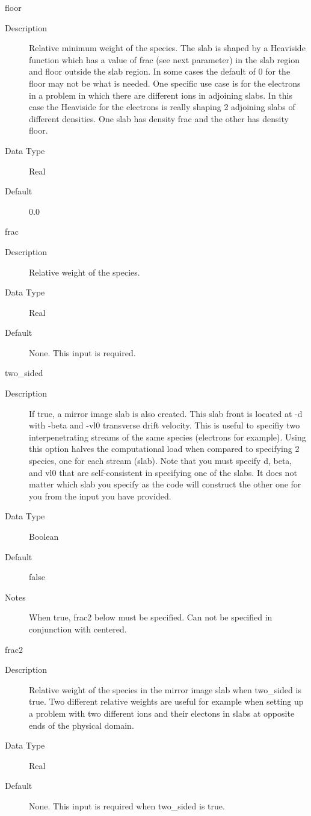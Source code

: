 \documentclass[11pt]{amsart}
\begin{document}
floor
\begin{description}
\item [Description] Relative minimum weight of the species.  The slab is shaped
by a Heaviside function which has a value of frac (see next parameter) in the
slab region and floor outside the slab region.  In some cases the default of 0
for the floor may not be what is needed.  One specific use case is for the
electrons in a problem in which there are different ions in adjoining slabs.  In
this case the Heaviside for the electrons is really shaping 2 adjoining slabs of
different densities.  One slab has density frac and the other has density floor.
\item [Data Type] Real
\item [Default] 0.0
\end{description}

frac
\begin{description}
\item [Description] Relative weight of the species.
\item [Data Type] Real
\item [Default] None.  This input is required.
\end{description}

two\_sided
\begin{description}
\item [Description] If true, a mirror image slab is also created.  This slab
front is located at -d with -beta and -vl0 transverse drift velocity.  This is
useful to specifiy two interpenetrating streams of the same species (electrons
for example).  Using this option halves the computational load when compared to
specifying 2 species, one for each stream (slab).  Note that you must specify
d, beta, and vl0 that are self-consistent in specifying one of the slabs.  It
does not matter which slab you specify as the code will construct the other one
for you from the input you have provided.
\item [Data Type] Boolean
\item [Default] false
\item [Notes] When true, frac2 below must be specified.  Can not be specified in
conjunction with centered.
\end{description}

frac2
\begin{description}
\item [Description] Relative weight of the species in the mirror image slab when
two\_sided is true.  Two different relative weights are useful for example when
setting up a problem with two different ions and their electons in slabs at
opposite ends of the physical domain.
\item [Data Type] Real
\item [Default] None.  This input is required when two\_sided is true.
\end{description}
\end{document}

